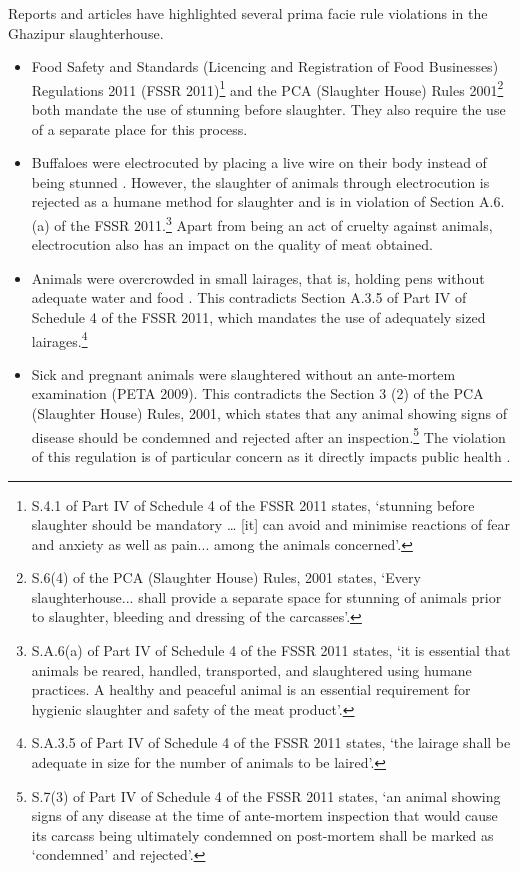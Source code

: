 \documentclass[a4paper, 12pt, twoside]{article}
\begin{document}
Reports and articles have highlighted several prima facie rule violations in the Ghazipur slaughterhouse. 

\begin{itemize}
\item Food Safety and Standards (Licencing and Registration of Food Businesses) Regulations 2011 (FSSR 2011)\footnote{S.4.1 of Part IV of Schedule 4 of the FSSR 2011 states, ‘stunning before slaughter should be mandatory … [it] can avoid and minimise reactions of fear and anxiety as well as pain... among the animals concerned’.} and the PCA (Slaughter House) Rules 2001\footnote{ S.6(4) of the PCA (Slaughter House) Rules, 2001 states, ‘Every slaughterhouse... shall provide a separate space for stunning of animals prior to slaughter, bleeding and dressing of the carcasses’.} both mandate the use of stunning before slaughter. They also require the use of a separate place for this process.
\item Buffaloes were electrocuted by placing a live wire on their body instead of being stunned \parencite{indiannews} \parencite{petareport}. However, the slaughter of animals through electrocution is rejected as a humane method for slaughter \parencite{chaudrypaper} and is in violation of Section A.6.(a) of the FSSR 2011.\footnote{ S.A.6(a) of Part IV of Schedule 4 of the FSSR 2011 states, ‘it is essential that animals be reared, handled, transported, and slaughtered using humane practices. A healthy and peaceful animal is an essential requirement for hygienic slaughter and safety of the meat product’.} Apart from being an act of cruelty against animals, electrocution also has an impact on the quality of meat obtained.
\item Animals were overcrowded in small lairages, that is, holding pens without adequate water and food \parencite{maanvinews}. This contradicts Section A.3.5 of Part IV of Schedule 4 of the FSSR 2011, which mandates the use of adequately sized lairages.\footnote{ S.A.3.5 of Part IV of Schedule 4 of the FSSR 2011 states, ‘the lairage shall be adequate in size for the number of animals to be laired’.}
\item Sick and pregnant animals were slaughtered without an ante-mortem examination (PETA 2009). This contradicts the Section 3 (2) of the PCA (Slaughter House) Rules, 2001, which states that any animal showing signs of disease should be condemned and rejected after an inspection.\footnote{ S.7(3) of Part IV of Schedule 4 of the FSSR 2011 states, ‘an animal showing signs of any disease at the time of ante-mortem inspection that would cause its carcass being ultimately condemned on post-mortem shall be marked as ‘condemned’ and rejected’.} The violation of this regulation is of particular concern as it directly impacts public health \parencite{mahaptranews}.

\end{itemize}
\end{document}
